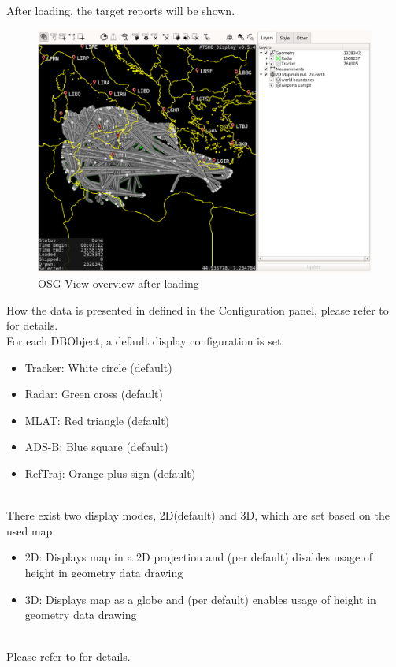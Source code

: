 After loading, the target reports will be shown.

\begin{figure}[H]
    \hspace*{-2.5cm}
    \includegraphics[width=19cm,frame]{figures/osgview_overview_loaded.png}
  \caption{OSG View overview after loading}
\end{figure} 

How the data is presented in defined in the Configuration panel, please refer to  for details. \\

For each DBObject, a default display configuration is set:

\begin{itemize}
 \item Tracker: White circle (default)
 \item Radar: Green cross (default)
 \item MLAT: Red triangle (default)
 \item ADS-B: Blue square (default)
 \item RefTraj: Orange plus-sign (default)
\end{itemize}
\ \\

There exist two display modes, 2D(default) and 3D, which are set based on the used map:

\begin{itemize}
 \item 2D: Displays map in a 2D projection and (per default) disables usage of height in geometry data drawing
 \item 3D: Displays map as a globe and (per default) enables usage of height in geometry data drawing
\end{itemize}
\ \\
Please refer to  for details.
